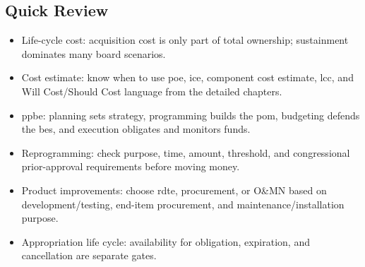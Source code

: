 \documentclass[../main.tex]{subfiles}
\begin{document}
\subsection{Quick Review}
\begin{itemize}
  \item Life-cycle cost: acquisition cost is only part of total ownership; sustainment dominates many board scenarios.
  \item Cost estimate: know when to use \ac{poe}, \ac{ice}, component cost estimate, \ac{lcc}, and Will Cost/Should Cost language from the detailed chapters.
  \item \ac{ppbe}: planning sets strategy, programming builds the \ac{pom}, budgeting defends the \ac{bes}, and execution obligates and monitors funds.
  \item Reprogramming: check purpose, time, amount, threshold, and congressional prior-approval requirements before moving money.
  \item Product improvements: choose \ac{rdte}, procurement, or O\&MN based on development/testing, end-item procurement, and maintenance/installation purpose.
  \item Appropriation life cycle: availability for obligation, expiration, and cancellation are separate gates.
\end{itemize}
\end{document}
